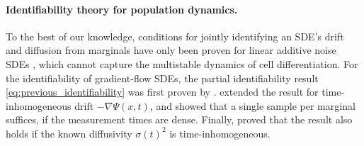 \documentclass[twoside]{article}
\begin{document}
\paragraph{Identifiability theory for population dynamics.} 
To the best of our knowledge, conditions for jointly identifying an SDE's drift and diffusion from marginals have only been proven for linear additive noise SDEs \citep{guan2024identifying}, which cannot capture the multistable dynamics of cell differentiation. 
For the identifiability of gradient-flow SDEs, the partial identifiability result \eqref{eq:previous_identifiability} was first proven by \citet{hashimoto2016learning}. \citet{lavenant2021towards} extended the result for time-inhomogeneous drift $-\nabla \Psi(x,t)$, and showed that a single sample per marginal suffices, if the measurement times are dense. Finally, \citet{neklyudov2023action} proved that the result also holds if the known diffusivity $\sigma(t)^2$ is time-inhomogeneous. 
\end{document}

